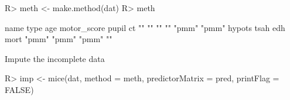 \documentclass[
]{jss}
\begin{document}
\begin{CodeChunk}
\begin{CodeInput}
R> meth <- make.method(dat)
R> meth
\end{CodeInput}
\begin{CodeOutput}
       name        type         age motor_score       pupil          ct 
         ""          ""          ""          ""       "pmm"       "pmm" 
     hypots        tsah         edh        mort 
      "pmm"       "pmm"       "pmm"          "" 
\end{CodeOutput}
\end{CodeChunk}

Impute the incomplete data

\begin{CodeChunk}
\begin{CodeInput}
R> imp <- mice(dat, method = meth, predictorMatrix = pred, printFlag = FALSE)
\end{CodeInput}
\end{CodeChunk}
\end{document}
